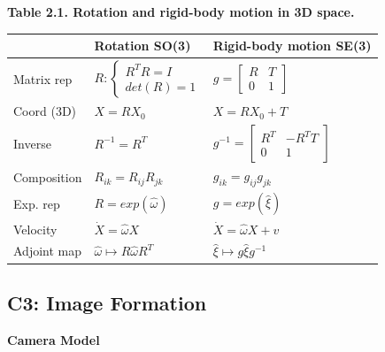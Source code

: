 \documentclass{../cheat}
\begin{document}
\begin{multicols}{3}
	\textbf{Table 2.1. Rotation and rigid-body motion in 3D space.}\\
	\begin{tabularx}{\columnwidth}{| @{ }p{47pt} | @{ }p{67pt} | X |}
	\hline
	& Rotation SO(3) & Rigid-body motion SE(3) \\ \hline \hline
	Matrix rep &  $R: \left\{ \begin{array}{l}
		R^T R=I\\ det(R)=1	\end{array}\right.$ & $g=\begin{bmatrix}
		R & T\\0 & 1 	\end{bmatrix}$\\ \hline
	Coord (3D) & $X=RX_0$ & $X=RX_0+T$\\ \hline
	Inverse & $R^{-1}=R^T$ & $g^{-1} = \begin{bmatrix}
		R^T & -R^T T\\ 0 & 1 \end{bmatrix}$\\ \hline
	Composition & $R_{ik} = R_{ij} R_{jk}$ & $g_{ik} = g_{ij} g_{jk}$\\ \hline \hline
	
	Exp. rep & $R = exp(\widehat{\omega})$ &  $g = exp(\widehat{\xi})$ \\ \hline
	Velocity & $\dot{X}=\widehat{\omega}X$ & $\dot{X} =\widehat{\omega}X +v$  \\ \hline
	Adjoint map & $\widehat{\omega} \mapsto R \widehat{\omega} R^T$ & $\widehat{\xi} \mapsto g \widehat{\xi} g^{-1}$  \\ \hline
	\end{tabularx}

\subsection{C3: Image Formation}
	\textbf{Camera Model}\\
	

\end{multicols}
\end{document}
